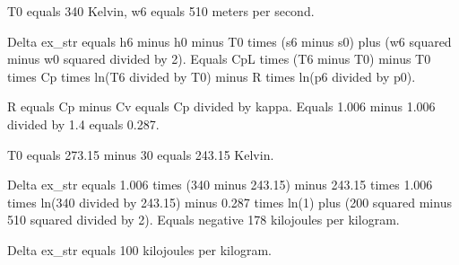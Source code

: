 T0 equals 340 Kelvin, w6 equals 510 meters per second.  

Delta ex_str equals h6 minus h0 minus T0 times (s6 minus s0) plus (w6 squared minus w0 squared divided by 2).  
Equals CpL times (T6 minus T0) minus T0 times Cp times ln(T6 divided by T0) minus R times ln(p6 divided by p0).  

R equals Cp minus Cv equals Cp divided by kappa.  
Equals 1.006 minus 1.006 divided by 1.4 equals 0.287.  

T0 equals 273.15 minus 30 equals 243.15 Kelvin.  

Delta ex_str equals 1.006 times (340 minus 243.15) minus 243.15 times 1.006 times ln(340 divided by 243.15) minus 0.287 times ln(1) plus (200 squared minus 510 squared divided by 2).  
Equals negative 178 kilojoules per kilogram.  

Delta ex_str equals 100 kilojoules per kilogram.